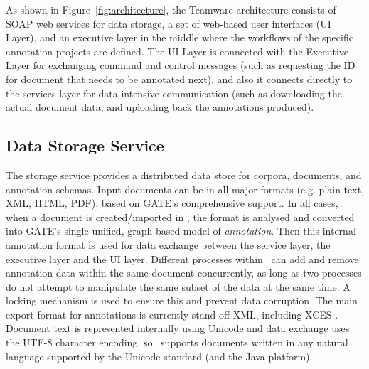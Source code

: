 As shown in Figure~\ref{fig:architecture}, the Teamware architecture consists of SOAP web services for data storage, a set of
web-based user interfaces (UI Layer), and an executive layer in the middle where the workflows of the specific annotation projects are defined. The UI Layer is connected with the Executive Layer for exchanging command and control messages (such as requesting the ID for document that needs to be annotated next), and also it connects directly to the services layer for data-intensive communication (such as downloading the actual document data, and uploading back the annotations produced). 

\subsection{Data Storage Service}

The storage service provides a distributed data store for corpora, documents, and annotation schemas. Input documents can be in all major formats (e.g. plain text, XML, HTML, PDF), based on GATE's comprehensive support. In all cases, when a document is
created/imported in \teamware, the format is analysed and converted into GATE's single unified, graph-based model of {\em annotation}. Then this internal annotation format is used for data exchange between the service layer, the executive layer and the UI layer. Different processes within \teamware\ can add and remove annotation data within the same document concurrently, as long as two processes do not attempt to manipulate the same subset of the data at the same time.  A locking mechanism is used to ensure this and prevent data corruption.  The main export format for annotations is currently stand-off XML, including XCES \cite{Ide00a}.  Document text is represented internally using Unicode and data exchange uses the UTF-8 character encoding, so \teamware\ supports documents written in any natural language supported by the Unicode standard (and the Java platform).

